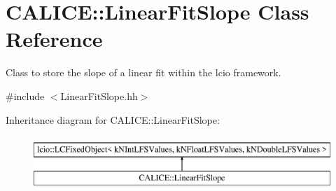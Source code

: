 \section{C\-A\-L\-I\-C\-E\-:\-:Linear\-Fit\-Slope Class Reference}
\label{classCALICE_1_1LinearFitSlope}


Class to store the slope of a linear fit within the lcio framework.  




{\ttfamily \#include $<$Linear\-Fit\-Slope.\-hh$>$}

Inheritance diagram for C\-A\-L\-I\-C\-E\-:\-:Linear\-Fit\-Slope\-:\begin{figure}[H]
\begin{center}
\leavevmode
\includegraphics[height=2.000000cm]{classCALICE_1_1LinearFitSlope}
\end{center}
\end{figure}
